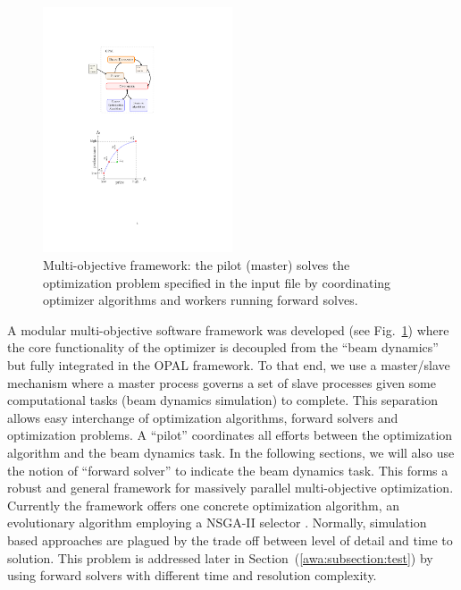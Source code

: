 \documentclass[preprint,linenumbers,amsmath,amssymb,aps,prstab]{revtex4-1}%
\begin{document}
\begin{figure}%
	\center
\includegraphics[width=0.5\textwidth]{opt-framework_code}
\caption{Multi-objective framework: the pilot (master) solves the
	optimization problem specified in the input file by coordinating optimizer
	algorithms and workers running forward solves.}
\label{fig:framenetwork}
\end{figure}

A modular multi-objective software framework was developed (see
 Fig.~\ref{fig:framenetwork}) where the core functionality of the optimizer is decoupled from
 the ``beam dynamics'' but fully integrated in the OPAL framework. 
To that end, we use a master/slave mechanism where a master process governs a
 set of slave processes given some computational tasks (beam dynamics simulation) to complete.
This separation allows easy interchange of optimization algorithms, forward
  solvers and optimization problems.
A ``pilot'' coordinates all efforts between the optimization algorithm and the
  beam dynamics task. In the following sections, we will also use the notion of ``forward solver'' to indicate the beam dynamics task.
This forms a robust and general framework for massively parallel
  multi-objective optimization.
Currently the framework offers one concrete optimization algorithm, an
  evolutionary algorithm employing a \textsc{NSGA-II} selector \cite{pisa}.
Normally, simulation based approaches are plagued by the trade off between
  level of detail and time to solution.
This problem is addressed later in Section~(\ref{awa:subsection:test}) by using forward solvers with different time and
  resolution complexity.
\end{document}
